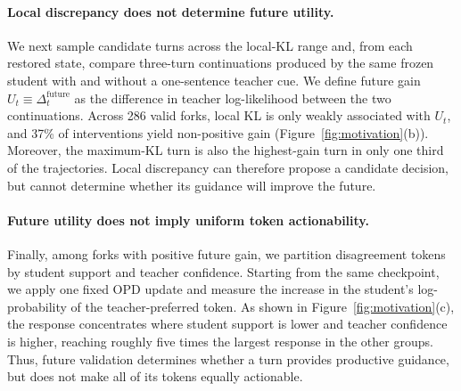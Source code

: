 \documentclass{article}
\begin{document}
\paragraph{Local discrepancy does not determine future utility.}
We next sample candidate turns across the local-KL range and, from each restored state, compare
three-turn continuations produced by the same frozen student with and without a one-sentence teacher
cue.  We define future gain $U_t\equiv\Delta_t^{\mathrm{future}}$ as the difference in teacher
log-likelihood between the two continuations.  Across 286 valid forks, local KL is only weakly
associated with $U_t$, and 37\% of
interventions yield non-positive gain (Figure~\ref{fig:motivation}(b)).  Moreover, the maximum-KL
turn is also the highest-gain turn in only one third of the trajectories.  Local discrepancy can
therefore propose a candidate decision, but cannot determine whether its guidance will improve the
future.

\paragraph{Future utility does not imply uniform token actionability.}
Finally, among forks with positive future gain, we partition disagreement tokens by student support
and teacher confidence.  Starting from the same checkpoint, we apply one fixed OPD update and
measure the increase in the student's log-probability of the teacher-preferred token.  As shown in
Figure~\ref{fig:motivation}(c), the response concentrates where student support is lower and teacher
confidence is higher, reaching roughly five times the largest response in the other groups.  Thus,
future validation determines whether a turn provides productive guidance, but does not make all of
its tokens equally actionable.
\end{document}
